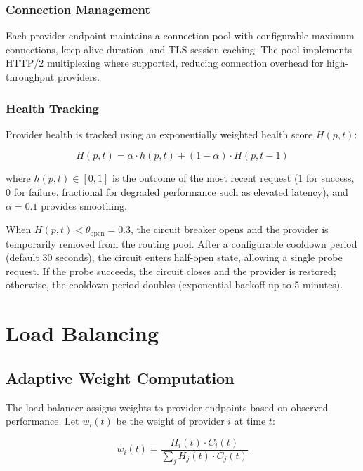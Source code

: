 \documentclass[11pt,twocolumn]{article}
\begin{document}
\subsubsection{Connection Management}

Each provider endpoint maintains a connection pool with configurable maximum connections, keep-alive duration, and TLS session caching. The pool implements HTTP/2 multiplexing where supported, reducing connection overhead for high-throughput providers.

\subsubsection{Health Tracking}

Provider health is tracked using an exponentially weighted health score $H(p, t)$:

\begin{equation}
H(p, t) = \alpha \cdot h(p, t) + (1 - \alpha) \cdot H(p, t-1)
\end{equation}

where $h(p, t) \in [0, 1]$ is the outcome of the most recent request (1 for success, 0 for failure, fractional for degraded performance such as elevated latency), and $\alpha = 0.1$ provides smoothing.

When $H(p, t) < \theta_{\text{open}} = 0.3$, the circuit breaker opens and the provider is temporarily removed from the routing pool. After a configurable cooldown period (default 30 seconds), the circuit enters half-open state, allowing a single probe request. If the probe succeeds, the circuit closes and the provider is restored; otherwise, the cooldown period doubles (exponential backoff up to 5 minutes).

\section{Load Balancing}
\label{sec:loadbalancing}

\subsection{Adaptive Weight Computation}

The load balancer assigns weights to provider endpoints based on observed performance. Let $w_i(t)$ be the weight of provider $i$ at time $t$:

\begin{equation}
w_i(t) = \frac{H_i(t) \cdot C_i(t)}{\sum_j H_j(t) \cdot C_j(t)}
\end{equation}
\end{document}
